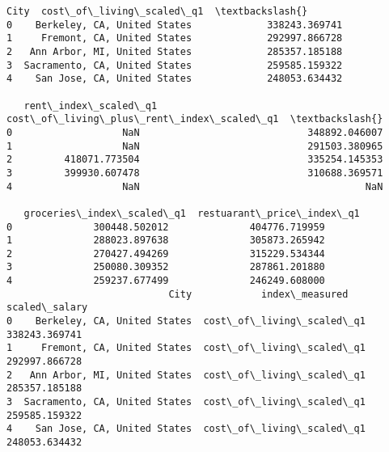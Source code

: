 \documentclass[11pt]{article}
\begin{document}
    \begin{Verbatim}[commandchars=\\\{\}]
                            City  cost\_of\_living\_scaled\_q1  \textbackslash{}
0    Berkeley, CA, United States             338243.369741
1     Fremont, CA, United States             292997.866728
2   Ann Arbor, MI, United States             285357.185188
3  Sacramento, CA, United States             259585.159322
4    San Jose, CA, United States             248053.634432

   rent\_index\_scaled\_q1  cost\_of\_living\_plus\_rent\_index\_scaled\_q1  \textbackslash{}
0                   NaN                             348892.046007
1                   NaN                             291503.380965
2         418071.773504                             335254.145353
3         399930.607478                             310688.369571
4                   NaN                                       NaN

   groceries\_index\_scaled\_q1  restuarant\_price\_index\_q1
0              300448.502012              404776.719959
1              288023.897638              305873.265942
2              270427.494269              315229.534344
3              250080.309352              287861.201880
4              259237.677499              246249.608000
                            City            index\_measured  scaled\_salary
0    Berkeley, CA, United States  cost\_of\_living\_scaled\_q1  338243.369741
1     Fremont, CA, United States  cost\_of\_living\_scaled\_q1  292997.866728
2   Ann Arbor, MI, United States  cost\_of\_living\_scaled\_q1  285357.185188
3  Sacramento, CA, United States  cost\_of\_living\_scaled\_q1  259585.159322
4    San Jose, CA, United States  cost\_of\_living\_scaled\_q1  248053.634432
    \end{Verbatim}

    \begin{center}
    \end{center}
    { \hspace*{\fill} \\}
    
\end{document}

